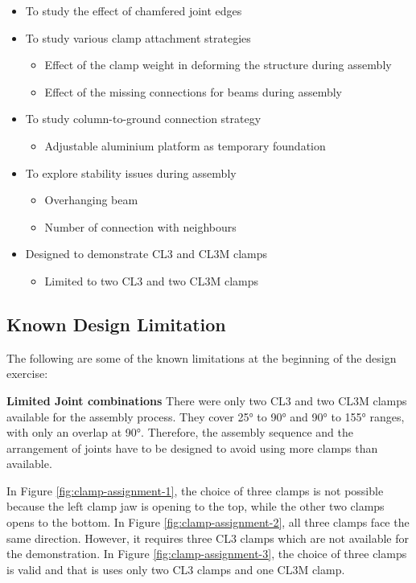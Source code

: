 \begin{itemize}[nosep]
    \item To study the effect of chamfered joint edges
    \item To study various clamp attachment strategies
    \begin{itemize}
        \item Effect of the clamp weight in deforming the structure during assembly
        \item Effect of the missing connections for beams during assembly
    \end{itemize}
    \item To study column-to-ground connection strategy
    \begin{itemize}
        \item Adjustable aluminium platform as temporary foundation
    \end{itemize}
    \item To explore stability issues during assembly
    \begin{itemize}
        \item Overhanging beam
        \item Number of connection with neighbours
    \end{itemize}
    \item Designed to demonstrate CL3 and CL3M clamps
    \begin{itemize}
        \item Limited to two CL3 and two CL3M clamps
    \end{itemize}
\end{itemize}

\subsection{Known Design Limitation}
\label{subsection:exploration-2-known-design-limitation}

The following are some of the known limitations at the beginning of the design exercise:

\textbf{Limited Joint combinations} There were only two CL3 and two CL3M clamps available for the assembly process. They cover 25° to 90° and 90° to 155° ranges, with only an overlap at 90°. Therefore, the assembly sequence and the arrangement of joints have to be designed to avoid using more clamps than available.

In Figure \ref{fig:clamp-assignment-1}, the choice of three clamps is not possible because the left clamp jaw is opening to the top, while the other two clamps opens to the bottom. In Figure \ref{fig:clamp-assignment-2}, all three clamps face the same direction. However, it requires three CL3 clamps which are not available for the demonstration. In Figure \ref{fig:clamp-assignment-3}, the choice of three clamps is valid and that is uses only two CL3 clamps and one CL3M clamp.

